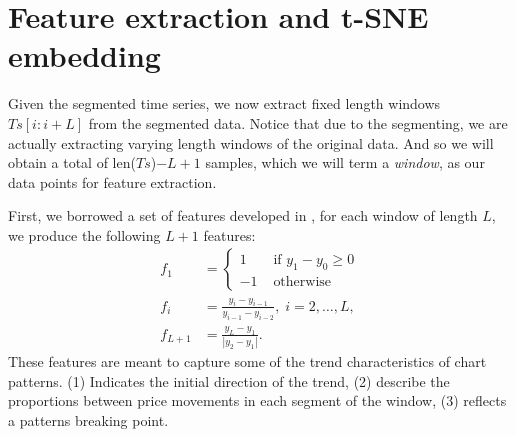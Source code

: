 \documentclass{article} %
\begin{document}
\section{Feature extraction and t-SNE embedding}
Given the segmented time series, we now extract fixed length windows $Ts[i:i+L]$ from the segmented data. Notice that due to the segmenting, we are actually extracting varying length windows of the original data. And so we will obtain a total of len($Ts$)$-L+1$ samples, which we will term a \textit{window}, as our data points for feature extraction. 

First, we borrowed a set of features developed in \cite{Guo07recognizingstock}, for each window of length $L$, we produce the following $L+1$ features:
\begin{align}
f_1 &= \left\{ \begin{array}{rl}
 1 &\mbox{ if $y_1-y_0 \geq 0$} \\
  -1 &\mbox{ otherwise}
       \end{array} \right.\\
f_i &= \frac{y_i-y_{i-1}}{y_{i-1}-y_{i-2}}, \; i=2,\ldots, L,\\
f_{L+1} &= \frac{y_L-y_1}{|y_2-y_1|}.
\end{align}
These features are meant to capture some of the trend characteristics of chart patterns. (1) Indicates the initial direction of the trend, (2) describe the proportions between price movements in each segment of the window, (3) reflects a patterns breaking point. 
\end{document}
